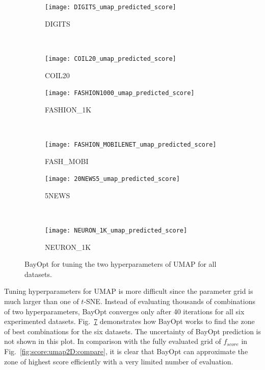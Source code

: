 \begin{figure}[ht!]
    \begin{subfigure}[b]{.48\linewidth}
        \centering
        \texttt{[image: DIGITS\_umap\_predicted\_score]}
        \caption{DIGITS}
        \label{fig:bo:umap:predict:DIGITS}
    \end{subfigure}
    ~
    \begin{subfigure}[b]{.48\linewidth}
        \centering
        \texttt{[image: COIL20\_umap\_predicted\_score]}
        \caption{COIL20}
        \label{fig:bo:umap:predict:COIL20}
    \end{subfigure}
    \vfill
    \begin{subfigure}[b]{.48\linewidth}
        \centering
        \texttt{[image: FASHION1000\_umap\_predicted\_score]}
        \caption{{FASHION\_1K}}
        \label{fig:bo:umap:predict:FASHION1K}
    \end{subfigure}
    ~
    \begin{subfigure}[b]{.48\linewidth}
        \centering
        \texttt{[image: FASHION\_MOBILENET\_umap\_predicted\_score]}
        \caption{{FASH\_MOBI}}
        \label{fig:bo:umap:predict:FASHMOBI}
    \end{subfigure}
    \vfill
    \begin{subfigure}[b]{.48\linewidth}
        \centering
        \texttt{[image: 20NEWS5\_umap\_predicted\_score]}
        \caption{5NEWS}
        \label{fig:bo:umap:predict:5NEWS}
    \end{subfigure}
    ~
    \begin{subfigure}[b]{.48\linewidth}
        \centering
        \texttt{[image: NEURON\_1K\_umap\_predicted\_score]}
        \caption{{NEURON\_1K}}
        \label{fig:bo:umap:predict:NEURON1K}
    \end{subfigure}
    \caption{BayOpt for tuning the two hyperparameters of UMAP for all datasets.}
    \label{fig:bo:umap:predict}
\end{figure}

Tuning hyperparameters for UMAP is more difficult since the parameter grid is much larger than one of $t$-SNE.
Instead of evaluating thousands of combinations of two hyperparameters, BayOpt converges only after 40 iterations for all six experimented datasets.
Fig.~\ref{fig:bo:umap:predict} demonstrates how BayOpt works to find the zone of best combinations for the six datasets.
The uncertainty of BayOpt prediction is not shown in this plot.
In comparison with the fully evaluated grid of $f_{score}$ in Fig.~\ref{fig:score:umap2D:compare},
it is clear that BayOpt can approximate the zone of highest score efficiently with a very limited number of evaluation.

